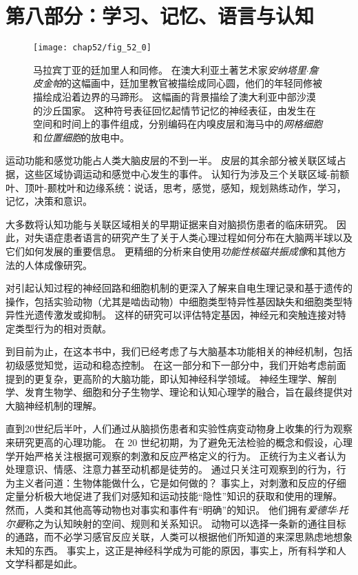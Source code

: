 \chapter*{第八部分：学习、记忆、语言与认知}


\begin{figure}[htbp]
	\centering
	\texttt{[image: chap52/fig\_52\_0]}
	\caption{马拉宾丁亚的廷加里人和同修。
		在澳大利亚土著艺术家\textit{安纳塔里$\cdot$詹皮金帕}的这幅画中，廷加里教官被描绘成同心圆，他们的年轻同修被描绘成沿着边界的马蹄形。
		这幅画的背景描绘了澳大利亚中部沙漠的沙丘国家。
		这种符号表征回忆起情节记忆的神经表征，由发生在空间和时间上的事件组成，分别编码在内嗅皮层和海马中的\textit{网格细胞}和\textit{位置细胞}的放电中。}
	\label{fig:52_0}
\end{figure}


运动功能和感觉功能占人类大脑皮层的不到一半。
皮层的其余部分被关联区域占据，这些区域协调运动和感觉中心发生的事件。
认知行为涉及三个关联区域-前额叶、顶叶-颞枕叶和边缘系统：说话，思考，感觉，感知，规划熟练动作，学习，记忆，决策和意识。


大多数将认知功能与关联区域相关的早期证据来自对脑损伤患者的临床研究。
因此，对失语症患者语言的研究产生了关于人类心理过程如何分布在大脑两半球以及它们如何发展的重要信息。
更精细的分析来自使用\textit{功能性核磁共振成像}和其他方法的人体成像研究。


对引起认知过程的神经回路和细胞机制的更深入了解来自电生理记录和基于遗传的操作，包括实验动物（尤其是啮齿动物）中细胞类型特异性基因缺失和细胞类型特异性光遗传激发或抑制。
这样的研究可以评估特定基因，神经元和突触连接对特定类型行为的相对贡献。


到目前为止，在这本书中，我们已经考虑了与大脑基本功能相关的神经机制，包括初级感觉知觉，运动和稳态控制。
在这一部分和下一部分中，我们开始考虑前面提到的更复杂，更高阶的大脑功能，即认知神经科学领域。
神经生理学、解剖学、发育生物学、细胞和分子生物学、理论和认知心理学的融合，旨在最终提供对大脑神经机制的理解。


直到20世纪后半叶，人们通过从脑损伤患者和实验性病变动物身上收集的行为观察来研究更高的心理功能。
在 20 世纪初期，为了避免无法检验的概念和假设，心理学开始严格关注根据可观察的刺激和反应严格定义的行为。
正统行为主义者认为处理意识、情感、注意力甚至动机都是徒劳的。
通过只关注可观察到的行为，行为主义者问道：生物体能做什么，它是如何做的？
事实上，对刺激和反应的仔细定量分析极大地促进了我们对感知和运动技能“隐性”知识的获取和使用的理解。
然而，人类和其他高等动物也对事实和事件有“明确”的知识。
他们拥有\textit{爱德华$\cdot$托尔曼}称之为认知映射的空间、规则和关系知识。
动物可以选择一条新的通往目标的通路，而不必学习感官反应关联，人类可以根据他们所知道的来深思熟虑地想象未知的东西。
事实上，这正是神经科学成为可能的原因，事实上，所有科学和人文学科都是如此。



